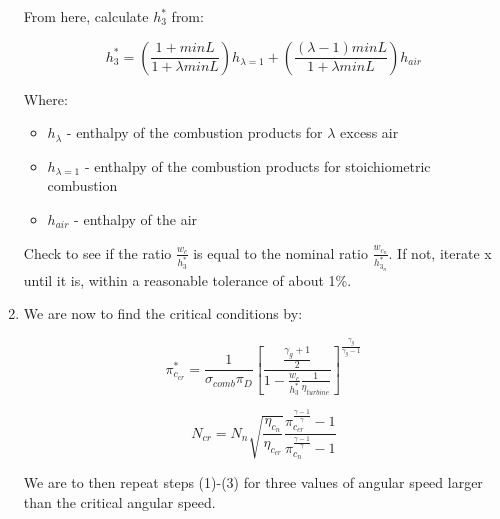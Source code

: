 \documentclass[12pt,english]{article}
\begin{document}
\begin{enumerate}
  From here, calculate $h_{3}^{*}$ from:

  \begin{equation}
    h_{3}^{*} = \left(\frac{1+minL}{1+\lambda minL}\right) h_{\lambda =1} + \left(\frac{(\lambda -1) minL}{1+\lambda minL}\right) h_{air}
  \end{equation}

  Where:
  \begin{itemize}
    \item $h_{\lambda}$ - enthalpy of the combustion products for $\lambda$ excess air
    \item $h_{\lambda =1}$ - enthalpy of the combustion products for stoichiometric combustion
    \item $h_{air}$ - enthalpy of the air
  \end{itemize}

  Check to see if the ratio $\frac{w_{c}}{h_{3}^{*}}$ is equal to the nominal ratio
  $\frac{w_{c_{n}}}{h_{3_{n}}^{*}}$. If not, iterate x until it is, within a reasonable tolerance of about 1\%.

  \item We are now to find the critical conditions by:
  
  \begin{equation}
    \pi_{c_{cr}}^{*} = \frac{1}{\sigma_{comb} \pi_{D}} \left[ \frac{\frac{\gamma_{g}+1}{2}}{1 - \frac{w_{c}}{h_{3}^{*}} \frac{1}{\eta_{turbine}}} \right]^{\frac{\gamma_{g}}{\gamma_{g}-1}}
  \end{equation}

  \begin{equation}
    N_{cr} = N_{n} \sqrt{\frac{\eta_{c_{n}}}{\eta_{c_{cr}}}} \frac{\pi_{c_{cr}}^{\frac{\gamma - 1}{\gamma}} -1}{\pi_{c_{n}}^{\frac{\gamma -1}{\gamma}} - 1}
  \end{equation}

  We are to then repeat steps (1)-(3) for three values of angular speed
  larger than the critical angular speed.
  
\end{enumerate}
\end{document}
